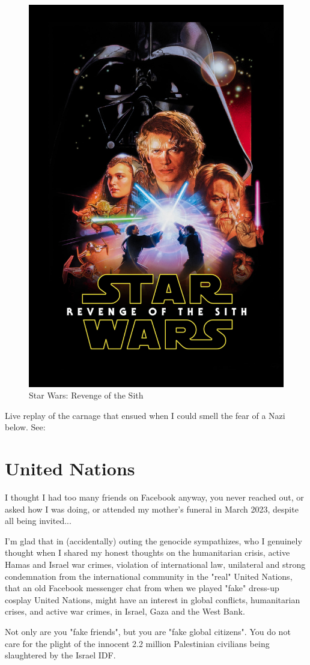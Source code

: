 \documentclass[16pt,openany,oneside]{book}
\begin{document}
\begin{figure}[H]
    \centering
    \includegraphics[width=0.5\linewidth]{assets/star_wars/revenge_of_the_sith.jpg}
    \caption{Star Wars: Revenge of the Sith}
    \label{fig:revenge-of-the-sith}
\end{figure}

Live replay of the carnage that ensued when I could smell the fear of a Nazi below.
See: \cite{lucas2017rogue}

\chapter{United Nations}

I thought I had too many friends on Facebook anyway, you never reached out, or asked how I was doing, or attended my mother's funeral in March 2023, despite all being invited...

I'm glad that in (accidentally) outing the genocide sympathizes, who I genuinely thought when I shared my honest thoughts on the humanitarian crisis, active Hamas and Israel war crimes, violation of international law, unilateral and strong condemnation from the international community in the "real" United Nations, that an old Facebook messenger chat from when we played 
    "fake" dress-up cosplay United Nations, 
might have an interest in global conflicts, humanitarian crises, and active war crimes, in Israel, Gaza and the West Bank.

Not only are you 
    "fake friends", 
but you are 
    "fake global citizens". 
You do not care for the plight of the innocent 2.2 million Palestinian civilians being slaughtered by the Israel IDF. 
\end{document}
